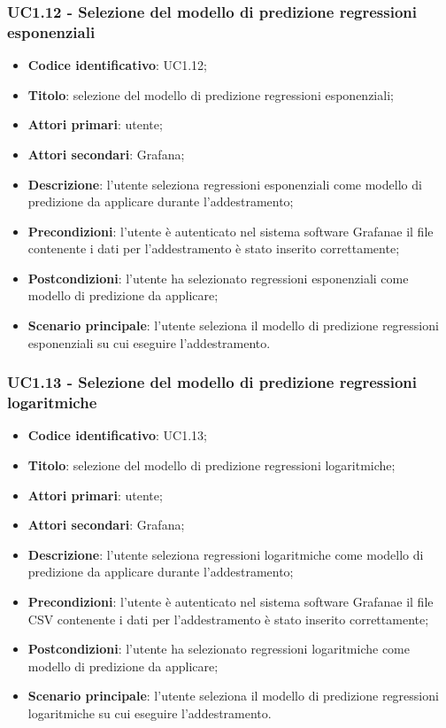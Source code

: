 \subsubsection{UC1.12 - Selezione del modello di predizione regressioni esponenziali}
\begin{itemize}
	\item \textbf{Codice identificativo}: UC1.12;
	\item \textbf{Titolo}: selezione del modello di predizione regressioni esponenziali;
	\item \textbf{Attori primari}: utente;
	\item \textbf{Attori secondari}: Grafana\glo;
	\item \textbf{Descrizione}: l'utente seleziona regressioni esponenziali come modello di predizione da applicare durante l'addestramento;
	\item \textbf{Precondizioni}: l'utente è autenticato nel sistema software Grafana\glosp e il file contenente i dati per l'addestramento è stato inserito correttamente;
	\item \textbf{Postcondizioni}: l'utente ha selezionato regressioni esponenziali come modello di predizione da applicare;
	\item \textbf{Scenario principale}: l'utente seleziona il modello di predizione regressioni esponenziali su cui eseguire l'addestramento.
\end{itemize}
\subsubsection{UC1.13 - Selezione del modello di predizione regressioni logaritmiche}
\begin{itemize}
	\item \textbf{Codice identificativo}: UC1.13;
	\item \textbf{Titolo}: selezione del modello di predizione regressioni logaritmiche;
	\item \textbf{Attori primari}: utente;
	\item \textbf{Attori secondari}: Grafana\glo;
	\item \textbf{Descrizione}: l'utente seleziona regressioni logaritmiche come modello di predizione da applicare durante l'addestramento;
	\item \textbf{Precondizioni}: l'utente è autenticato nel sistema software Grafana\glosp e il file CSV contenente i dati per l'addestramento è stato inserito correttamente;
	\item \textbf{Postcondizioni}: l'utente ha selezionato regressioni logaritmiche come modello di predizione da applicare;
	\item \textbf{Scenario principale}: l'utente seleziona il modello di predizione regressioni logaritmiche su cui eseguire l'addestramento.
\end{itemize}
